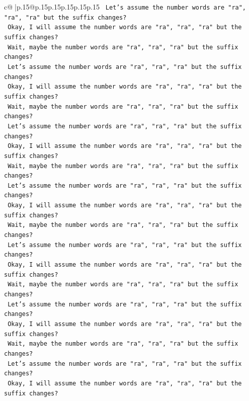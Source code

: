 \documentclass{article}
\begin{document}
{\begin{supertabular}{c@{$\;$}|p{.15\linewidth}@{}p{.15\linewidth}p{.15\linewidth}p{.15\linewidth}p{.15\linewidth}p{.15\linewidth}}
{{{\texttt{    Let's assume the number words are "ra", "ra", "ra" but the suffix changes?} \\
\texttt{    Okay, I will assume the number words are "ra", "ra", "ra" but the suffix changes?} \\
\texttt{    Wait, maybe the number words are "ra", "ra", "ra" but the suffix changes?} \\
\texttt{    Let's assume the number words are "ra", "ra", "ra" but the suffix changes?} \\
\texttt{    Okay, I will assume the number words are "ra", "ra", "ra" but the suffix changes?} \\
\texttt{    Wait, maybe the number words are "ra", "ra", "ra" but the suffix changes?} \\
\texttt{    Let's assume the number words are "ra", "ra", "ra" but the suffix changes?} \\
\texttt{    Okay, I will assume the number words are "ra", "ra", "ra" but the suffix changes?} \\
\texttt{    Wait, maybe the number words are "ra", "ra", "ra" but the suffix changes?} \\
\texttt{    Let's assume the number words are "ra", "ra", "ra" but the suffix changes?} \\
\texttt{    Okay, I will assume the number words are "ra", "ra", "ra" but the suffix changes?} \\
\texttt{    Wait, maybe the number words are "ra", "ra", "ra" but the suffix changes?} \\
\texttt{    Let's assume the number words are "ra", "ra", "ra" but the suffix changes?} \\
\texttt{    Okay, I will assume the number words are "ra", "ra", "ra" but the suffix changes?} \\
\texttt{    Wait, maybe the number words are "ra", "ra", "ra" but the suffix changes?} \\
\texttt{    Let's assume the number words are "ra", "ra", "ra" but the suffix changes?} \\
\texttt{    Okay, I will assume the number words are "ra", "ra", "ra" but the suffix changes?} \\
\texttt{    Wait, maybe the number words are "ra", "ra", "ra" but the suffix changes?} \\
\texttt{    Let's assume the number words are "ra", "ra", "ra" but the suffix changes?} \\
\texttt{    Okay, I will assume the number words are "ra", "ra", "ra" but the suffix changes?} \\
}}}
\end{supertabular}}
\end{document}
